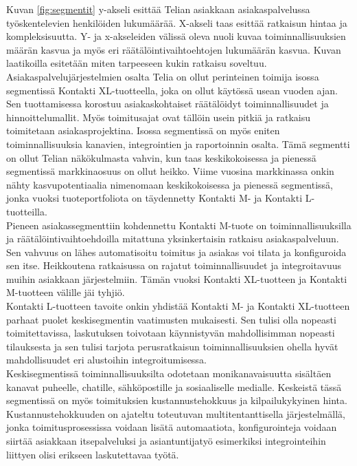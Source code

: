 \documentclass[finnish,12pt,a4paper,pdftex]{article}
\begin{document}
Kuvan \ref{fig:segmentit} y-akseli esittää Telian asiakkaan asiakaspalvelussa työskentelevien henkilöiden lukumäärää. X-akseli taas esittää ratkaisun hintaa ja kompleksisuutta. Y- ja x-akseleiden välissä oleva nuoli kuvaa toiminnallisuuksien määrän kasvua ja myös eri räätälöintivaihtoehtojen lukumäärän kasvua. Kuvan laatikoilla esitetään miten tarpeeseen kukin ratkaisu soveltuu.\\

\noindent Asiakaspalvelujärjestelmien osalta Telia on ollut perinteinen toimija isossa segmentissä Kontakti XL-tuotteella, joka on ollut käytössä usean vuoden ajan. Sen tuottamisessa korostuu asiakaskohtaiset räätälöidyt toiminnallisuudet ja hinnoittelumallit. Myös toimitusajat ovat tällöin usein pitkiä ja ratkaisu toimitetaan asiakasprojektina. Isossa segmentissä on myös eniten toiminnallisuuksia kanavien, integrointien ja raportoinnin osalta. Tämä segmentti on ollut Telian näkökulmasta vahvin, kun taas keskikokoisessa ja pienessä segmentissä markkinaosuus on ollut heikko. Viime vuosina markkinassa onkin nähty kasvupotentiaalia nimenomaan keskikokoisessa ja pienessä segmentissä, jonka vuoksi tuoteportfoliota on täydennetty Kontakti M- ja Kontakti L-tuotteilla.\\

\noindent Pieneen asiakassegmenttiin kohdennettu Kontakti M-tuote on toiminnallisuuksilla ja räätälöintivaihtoehdoilla mitattuna yksinkertaisin ratkaisu asiakaspalveluun. Sen vahvuus on lähes automatisoitu toimitus ja asiakas voi tilata ja konfiguroida sen itse. Heikkoutena ratkaisussa on rajatut toiminnallisuudet ja integroitavuus muihin asiakkaan järjestelmiin. Tämän vuoksi Kontakti XL-tuotteen ja Kontakti M-tuotteen välille jäi tyhjiö.\\

Kontakti L-tuotteen tavoite onkin yhdistää Kontakti M- ja Kontakti XL-tuotteen parhaat puolet keskisegmentin vaatimusten mukaisesti. Sen tulisi olla nopeasti toimitettavissa, laskutuksen toivotaan käynnistyvän mahdollisimman nopeasti tilauksesta ja sen tulisi tarjota perusratkaisun toiminnallisuuksien ohella hyvät mahdollisuudet eri alustoihin integroitumisessa.\\

Keskisegmentissä toiminnallisuuksilta odotetaan monikanavaisuutta sisältäen kanavat puheelle, chatille, sähköpostille ja sosiaaliselle medialle. Keskeistä tässä segmentissä on myös toimituksien kustannustehokkuus ja kilpailukykyinen hinta. Kustannustehokkuuden on ajateltu toteutuvan multitentanttisella järjestelmällä, jonka toimitusprosessissa voidaan lisätä automaatiota, konfigurointeja voidaan siirtää asiakkaan itsepalveluksi ja asiantuntijatyö esimerkiksi integrointeihin liittyen olisi erikseen laskutettavaa työtä.\\
\end{document}
